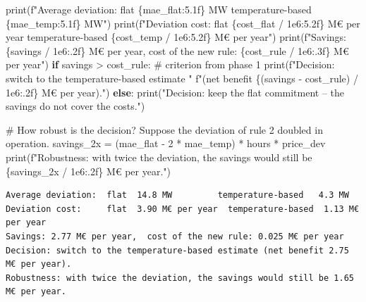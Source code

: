 \documentclass[
  letterpaper,
  DIV=11,
  numbers=noendperiod]{scrreprt}
\newenvironment{Shaded}{\begin{snugshade}}{\end{snugshade}}
\newcommand{\BuiltInTok}[1]{\textcolor[rgb]{0.00,0.23,0.31}{#1}}
\newcommand{\CommentTok}[1]{\textcolor[rgb]{0.37,0.37,0.37}{#1}}
\newcommand{\ControlFlowTok}[1]{\textcolor[rgb]{0.00,0.23,0.31}{\textbf{#1}}}
\newcommand{\DecValTok}[1]{\textcolor[rgb]{0.68,0.00,0.00}{#1}}
\newcommand{\FloatTok}[1]{\textcolor[rgb]{0.68,0.00,0.00}{#1}}
\newcommand{\NormalTok}[1]{\textcolor[rgb]{0.00,0.23,0.31}{#1}}
\newcommand{\OperatorTok}[1]{\textcolor[rgb]{0.37,0.37,0.37}{#1}}
\newcommand{\SpecialCharTok}[1]{\textcolor[rgb]{0.37,0.37,0.37}{#1}}
\newcommand{\SpecialStringTok}[1]{\textcolor[rgb]{0.13,0.47,0.30}{#1}}
\newcommand{\StringTok}[1]{\textcolor[rgb]{0.13,0.47,0.30}{#1}}
\begin{document}
\begin{Shaded}
\begin{Highlighting}[]
\BuiltInTok{print}\NormalTok{(}\SpecialStringTok{f"Average deviation:  flat }\SpecialCharTok{\{}\NormalTok{mae\_flat}\SpecialCharTok{:5.1f\}}\SpecialStringTok{ MW         temperature{-}based }\SpecialCharTok{\{}\NormalTok{mae\_temp}\SpecialCharTok{:5.1f\}}\SpecialStringTok{ MW"}\NormalTok{)}
\BuiltInTok{print}\NormalTok{(}\SpecialStringTok{f"Deviation cost:     flat }\SpecialCharTok{\{}\NormalTok{cost\_flat }\OperatorTok{/} \FloatTok{1e6}\SpecialCharTok{:5.2f\}}\SpecialStringTok{ M€ per year  temperature{-}based }\SpecialCharTok{\{}\NormalTok{cost\_temp }\OperatorTok{/} \FloatTok{1e6}\SpecialCharTok{:5.2f\}}\SpecialStringTok{ M€ per year"}\NormalTok{)}
\BuiltInTok{print}\NormalTok{(}\SpecialStringTok{f"Savings: }\SpecialCharTok{\{}\NormalTok{savings }\OperatorTok{/} \FloatTok{1e6}\SpecialCharTok{:.2f\}}\SpecialStringTok{ M€ per year,  cost of the new rule: }\SpecialCharTok{\{}\NormalTok{cost\_rule }\OperatorTok{/} \FloatTok{1e6}\SpecialCharTok{:.3f\}}\SpecialStringTok{ M€ per year"}\NormalTok{)}
\ControlFlowTok{if}\NormalTok{ savings }\OperatorTok{\textgreater{}}\NormalTok{ cost\_rule:                                               }\CommentTok{\# criterion from phase 1}
    \BuiltInTok{print}\NormalTok{(}\SpecialStringTok{f"Decision: switch to the temperature{-}based estimate "}
          \SpecialStringTok{f"(net benefit }\SpecialCharTok{\{}\NormalTok{(savings }\OperatorTok{{-}}\NormalTok{ cost\_rule) }\OperatorTok{/} \FloatTok{1e6}\SpecialCharTok{:.2f\}}\SpecialStringTok{ M€ per year)."}\NormalTok{)}
\ControlFlowTok{else}\NormalTok{:}
    \BuiltInTok{print}\NormalTok{(}\StringTok{"Decision: keep the flat commitment – the savings do not cover the costs."}\NormalTok{)}

\CommentTok{\# How robust is the decision? Suppose the deviation of rule 2 doubled in operation.}
\NormalTok{savings\_2x }\OperatorTok{=}\NormalTok{ (mae\_flat }\OperatorTok{{-}} \DecValTok{2} \OperatorTok{*}\NormalTok{ mae\_temp) }\OperatorTok{*}\NormalTok{ hours }\OperatorTok{*}\NormalTok{ price\_dev}
\BuiltInTok{print}\NormalTok{(}\SpecialStringTok{f"Robustness: with twice the deviation, the savings would still be }\SpecialCharTok{\{}\NormalTok{savings\_2x }\OperatorTok{/} \FloatTok{1e6}\SpecialCharTok{:.2f\}}\SpecialStringTok{ M€ per year."}\NormalTok{)}
\end{Highlighting}
\end{Shaded}

\begin{verbatim}
Average deviation:  flat  14.8 MW         temperature-based   4.3 MW
Deviation cost:     flat  3.90 M€ per year  temperature-based  1.13 M€ per year
Savings: 2.77 M€ per year,  cost of the new rule: 0.025 M€ per year
Decision: switch to the temperature-based estimate (net benefit 2.75 M€ per year).
Robustness: with twice the deviation, the savings would still be 1.65 M€ per year.
\end{verbatim}
\end{document}
